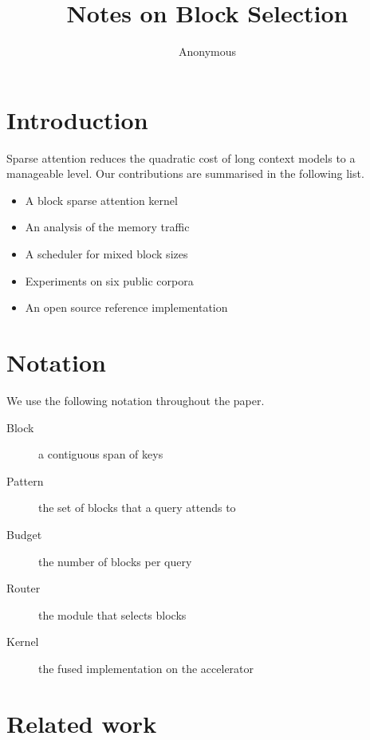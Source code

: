 \documentclass[10pt]{article}
\title{Notes on Block Selection}
\author{Anonymous}
\date{}
\newcommand{\s}[1]{#1}
\newcommand{\sn}[1]{}
\begin{document}
\maketitle

\section{Introduction}

\s{Sparse attention reduces the quadratic cost of long context models to a manageable level.}
\s{Our contributions are summarised in the following list.}

\sn{• A block sparse attention kernel • An analysis of the memory traffic • A scheduler for mixed block sizes • Experiments on six public corpora • An open source reference implementation}
{\small
\begin{itemize}
\item A block sparse attention kernel
\item An analysis of the memory traffic
\item A scheduler for mixed block sizes
\item Experiments on six public corpora
\item An open source reference implementation
\end{itemize}
}

\section{Notation}

\s{We use the following notation throughout the paper.}

\sn{Block a contiguous span of keys Pattern the set of blocks that a query attends to Budget the number of blocks per query Router the module that selects blocks Kernel the fused implementation on the accelerator}
{\footnotesize
\begin{description}
\item[Block] a contiguous span of keys
\item[Pattern] the set of blocks that a query attends to
\item[Budget] the number of blocks per query
\item[Router] the module that selects blocks
\item[Kernel] the fused implementation on the accelerator
\end{description}
}

\section{Related work}
\end{document}
